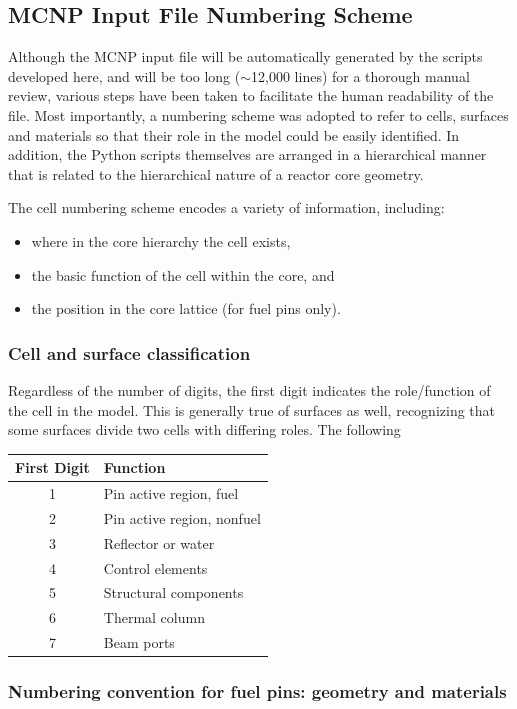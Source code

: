 \documentclass{UWNR_modeling}
\begin{document}
\subsection{MCNP Input File Numbering Scheme}

Although the MCNP input file will be automatically generated by the scripts developed here, and will be too long ($\sim$12,000 lines) for a thorough manual review, various steps have been taken to facilitate the human readability of the file.   Most importantly, a numbering scheme was adopted to refer to cells, surfaces and materials so that their role in the model could be easily identified.  In addition, the Python scripts themselves are arranged in a hierarchical manner that is related to the hierarchical nature of a reactor core geometry.

The cell numbering scheme encodes a variety of information, including:
\begin{itemize}
\item where in the core hierarchy the cell exists,
\item the basic function of the cell within the core, and
\item the position in the core lattice (for fuel pins only).
\end{itemize}
\subsubsection{Cell and surface classification}

Regardless of the number of digits, the first digit indicates the role/function of the cell in the model.  This is generally true of surfaces as well, recognizing that some surfaces divide two cells with differing roles.  The following

\begin{tabular}{|c|l|}
\hline First Digit & Function\\\hline
1 & Pin active region, fuel\\
2 & Pin active region, nonfuel\\
3 & Reflector or water\\
4 & Control elements\\
5 & Structural components\\
6 & Thermal column\\
7 & Beam ports\\\hline
\end{tabular}

\subsubsection{Numbering convention for fuel pins: geometry and materials}
\end{document}
